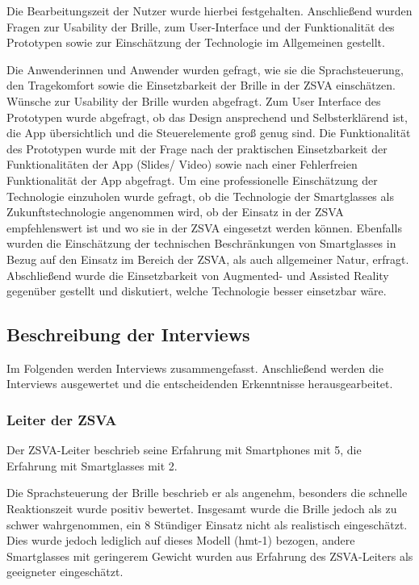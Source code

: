 Die Bearbeitungszeit der Nutzer wurde hierbei festgehalten. Anschließend wurden Fragen zur Usability der Brille, zum User-Interface und der Funktionalität des Prototypen sowie zur Einschätzung der Technologie im Allgemeinen gestellt.

Die Anwenderinnen und Anwender wurden gefragt, wie sie die Sprachsteuerung, den Tragekomfort sowie die Einsetzbarkeit der Brille in der ZSVA einschätzen. Wünsche zur Usability der Brille wurden abgefragt. Zum User Interface des Prototypen wurde abgefragt, ob das Design ansprechend und Selbsterklärend ist, die App übersichtlich und die Steuerelemente groß genug sind. Die Funktionalität des Prototypen wurde mit der Frage nach der praktischen Einsetzbarkeit der Funktionalitäten der App (Slides/ Video) sowie nach einer Fehlerfreien Funktionalität der App abgefragt. Um eine professionelle Einschätzung der Technologie einzuholen wurde gefragt, ob die Technologie der Smartglasses als Zukunftstechnologie angenommen wird, ob der Einsatz in der ZSVA empfehlenswert ist und wo sie in der ZSVA eingesetzt werden können. Ebenfalls wurden die Einschätzung der technischen Beschränkungen von Smartglasses in Bezug auf den Einsatz im Bereich der ZSVA, als auch allgemeiner Natur, erfragt. Abschließend wurde die Einsetzbarkeit von Augmented- und Assisted Reality gegenüber gestellt und diskutiert, welche Technologie besser einsetzbar wäre.
%
%
%
%
%
%
%
\subsection{Beschreibung der Interviews}
Im Folgenden werden Interviews zusammengefasst. Anschließend werden die Interviews ausgewertet und die entscheidenden Erkenntnisse herausgearbeitet.
\label{sec:Beschreinung_der_Interviews}
%
%
\subsubsection{Leiter der ZSVA}
%
Der ZSVA-Leiter beschrieb seine Erfahrung mit Smartphones mit 5, die Erfahrung mit Smartglasses mit 2.

Die Sprachsteuerung der Brille beschrieb er als angenehm, besonders die schnelle Reaktionszeit wurde positiv bewertet. Insgesamt wurde die Brille jedoch als zu schwer wahrgenommen, ein 8 Stündiger Einsatz nicht als realistisch eingeschätzt. Dies wurde jedoch lediglich auf dieses Modell (hmt-1) bezogen, andere Smartglasses mit geringerem Gewicht wurden aus Erfahrung des ZSVA-Leiters als geeigneter eingeschätzt.

